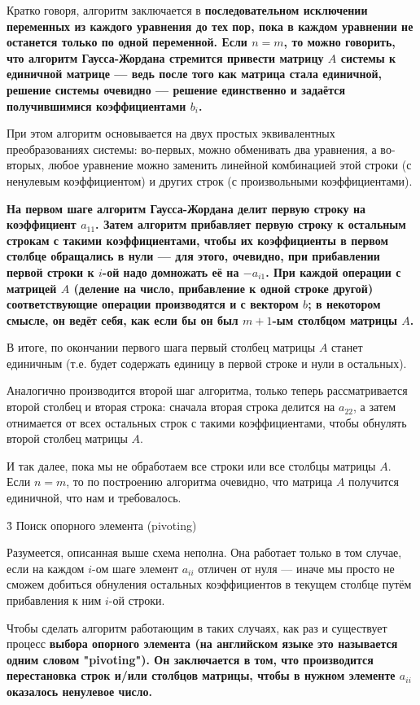 Кратко говоря, алгоритм заключается в \bf{последовательном исключении} переменных из каждого уравнения до тех пор, пока в каждом уравнении не останется только по одной переменной. Если $n=m$, то можно говорить, что алгоритм Гаусса-Жордана стремится привести матрицу $A$ системы к единичной матрице --- ведь после того как матрица стала единичной, решение системы очевидно --- решение единственно и задаётся получившимися коэффициентами $b_i$.

При этом алгоритм основывается на двух простых эквивалентных преобразованиях системы: во-первых, можно обменивать два уравнения, а во-вторых, любое уравнение можно заменить линейной комбинацией этой строки (с ненулевым коэффициентом) и других строк (с произвольными коэффициентами).

\bf{На первом шаге} алгоритм Гаусса-Жордана делит первую строку на коэффициент $a_{11}$. Затем алгоритм прибавляет первую строку к остальным строкам с такими коэффициентами, чтобы их коэффициенты в первом столбце обращались в нули --- для этого, очевидно, при прибавлении первой строки к $i$-ой надо домножать её на $-a_{i1}$. При каждой операции с матрицей $A$ (деление на число, прибавление к одной строке другой) соответствующие операции производятся и с вектором $b$; в некотором смысле, он ведёт себя, как если бы он был $m+1$-ым столбцом матрицы $A$.

В итоге, по окончании первого шага первый столбец матрицы $A$ станет единичным (т.е. будет содержать единицу в первой строке и нули в остальных).

Аналогично производится второй шаг алгоритма, только теперь рассматривается второй столбец и вторая строка: сначала вторая строка делится на $a_{22}$, а затем отнимается от всех остальных строк с такими коэффициентами, чтобы обнулять второй столбец матрицы $A$.

И так далее, пока мы не обработаем все строки или все столбцы матрицы $A$. Если $n=m$, то по построению алгоритма очевидно, что матрица $A$ получится единичной, что нам и требовалось.


\h3{ Поиск опорного элемента (pivoting) }

Разумеется, описанная выше схема неполна. Она работает только в том случае, если на каждом $i$-ом шаге элемент $a_{ii}$ отличен от нуля --- иначе мы просто не сможем добиться обнуления остальных коэффициентов в текущем столбце путём прибавления к ним $i$-ой строки.

Чтобы сделать алгоритм работающим в таких случаях, как раз и существует процесс \bf{выбора опорного элемента} (на английском языке это называется одним словом "pivoting"). Он заключается в том, что производится перестановка строк и/или столбцов матрицы, чтобы в нужном элементе $a_{ii}$ оказалось ненулевое число.

